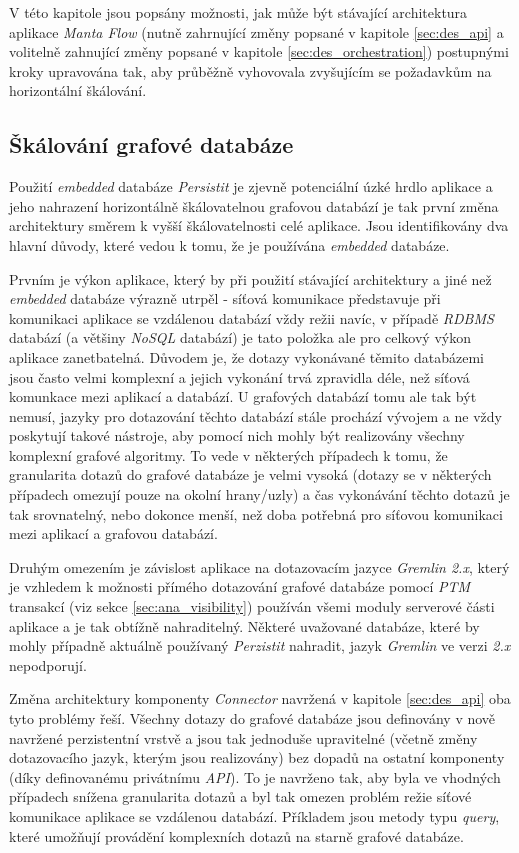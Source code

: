 V této kapitole jsou popsány možnosti, jak může být stávající architektura aplikace \textit{Manta Flow} (nutně zahrnující změny popsané v kapitole \ref{sec:des_api} a volitelně zahnující změny popsané v kapitole \ref{sec:des_orchestration}) postupnými kroky upravována tak, aby průběžně vyhovovala zvyšujícím se požadavkům na horizontální škálování.


\subsection{Škálování grafové databáze}
\label{sec:des_scaling_db}
Použití \textit{embedded} databáze \textit{Persistit} je zjevně potenciální úzké hrdlo aplikace a jeho nahrazení horizontálně škálovatelnou grafovou databází je tak první změna architektury směrem k vyšší škálovatelnosti celé aplikace. Jsou identifikovány dva hlavní důvody, které vedou k tomu, že je používána \textit{embedded} databáze.

Prvním je výkon aplikace, který by při použití stávající architektury a jiné než \textit{embedded} databáze výrazně utrpěl - síťová komunikace představuje při komunikaci aplikace se vzdálenou databází vždy režii navíc, v případě \textit{RDBMS} databází (a většiny \textit{NoSQL} databází) je tato položka ale pro celkový výkon aplikace zanetbatelná. Důvodem je, že dotazy vykonávané těmito databázemi jsou často velmi komplexní a jejich vykonání trvá zpravidla déle, než síťová komunkace mezi aplikací a databází. U grafových databází tomu ale tak být nemusí, jazyky pro dotazování těchto databází stále prochází vývojem a ne vždy poskytují takové nástroje, aby pomocí nich mohly být realizovány všechny komplexní grafové algoritmy. To vede v některých případech k tomu, že granularita dotazů do grafové databáze je velmi vysoká (dotazy se v některých případech omezují pouze na okolní hrany/uzly) a čas vykonávání těchto dotazů je tak srovnatelný, nebo dokonce menší, než doba potřebná pro síťovou komunikaci mezi aplikací a grafovou databází.

Druhým omezením je závislost aplikace na dotazovacím jazyce \textit{Gremlin 2.x}, který je vzhledem k možnosti přímého dotazování grafové databáze pomocí \textit{PTM} transakcí (viz sekce \ref{sec:ana_visibility}) používán všemi moduly serverové části aplikace a je tak obtížně nahraditelný. Některé uvažované databáze, které by mohly případně aktuálně používaný \textit{Perzistit} nahradit, jazyk \textit{Gremlin} ve verzi \textit{2.x} nepodporují.

Změna architektury komponenty \textit{Connector} navržená v kapitole \ref{sec:des_api} oba tyto problémy řeší. Všechny dotazy do grafové databáze jsou definovány v nově navržené perzistentní vrstvě a jsou tak jednoduše upravitelné (včetně změny dotazovacího jazyk, kterým jsou realizovány) bez dopadů na ostatní komponenty (díky definovanému privátnímu \textit{API}). To je navrženo tak, aby byla ve vhodných případech snížena granularita dotazů a byl tak omezen problém režie síťové komunikace aplikace se vzdálenou databází. Příkladem jsou metody typu \textit{query}, které umožňují provádění komplexních dotazů na starně grafové databáze.

